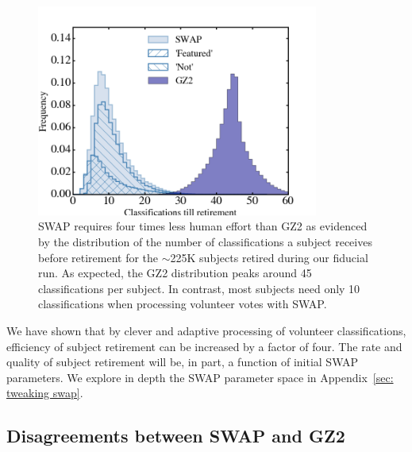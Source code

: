\documentclass[twocolumn]{aastex6}
\begin{document}
\begin{figure}[t!]
\includegraphics[width=3.65in]{figures/GZX_clicks_till_retired_baseline.png}
\caption{SWAP requires four times less human effort than GZ2 as evidenced by the distribution of the number of classifications a subject receives before retirement for the $\sim$225K subjects retired during our fiducial run.  As expected, the GZ2 distribution peaks around 45 classifications per subject. In contrast, most subjects need only 10 classifications when processing volunteer votes with SWAP.  \label{fig: swap vote distributions}}
\end{figure}



We have shown that by clever and adaptive processing of volunteer classifications, 
efficiency of subject retirement can be increased by a factor of four. 
The rate and quality of subject retirement will be, in part, a function of initial 
SWAP parameters. We explore in depth the SWAP parameter
space in Appendix~\ref{sec: tweaking swap}.




\subsection{Disagreements between SWAP and GZ2}
\end{document}
